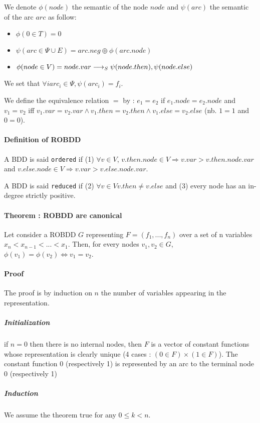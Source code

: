 \documentclass[a4paper,10pt]{article}
\begin{document}

We denote $\phi(node)$ the semantic of the node $node$ and $\psi(arc)$ the semantic of the arc $arc$ as follow:\begin{itemize}
\item $\phi(0 \in T) = 0$
\item $\psi(arc \in \Psi \cup E) = arc.neg \oplus \phi(arc.node)$
\item $\phi(node \in V) = node.var \longrightarrow_S \psi(node.then), \psi(node.else)$
\end{itemize}

We set that $\forall i arc_i \in \Psi, \psi(arc_i) = f_i$.

We define the equivalence relation $=$ by : $e_1 = e_2$ if $e_1.node = e_2.node$ and $v_1 = v_2$ iff $v_1.var = v_2.var \land v_1.then = v_2.then \land v_1.else = v_2.else$ (nb. $1=1$ and $0=0$).

\paragraph{Definition of ROBDD\\}
A BDD is said \texttt{ordered} if (1) $\forall v\in V$, $v.then.node \in V \Rightarrow v.var > v.then.node.var$ and $v.else.node \in V \Rightarrow v.var > v.else.node.var$.

A BDD is said \texttt{reduced} if (2) $\forall v\in V v.then \neq v.else$ and (3) every node has an in-degree strictly positive.

\paragraph{Theorem : ROBDD are canonical\\}

Let consider a ROBDD $G$ representing $F=(f_1, ..., f_n)$ over a set of n variables $x_n < x_{n-1} < ... < x_1$. Then, for every nodes $v_1, v_2 \in G$, $\phi(v_1) = \phi(v_2) \Leftrightarrow v_1 = v_2$.

\paragraph{Proof\\}
The proof is by induction on $n$ the number of variables appearing in the representation.
\subparagraph{Initialization\\}
if $n=0$ then there is no internal nodes, then $F$ is a vector of constant functions whose representation is clearly unique (4 cases : $(0\in F) \times (1\in F)$).
The constant function 0 (respectively 1) is represented by an arc to the terminal node 0 (respectively 1)
\subparagraph{Induction\\}
We assume the theorem true for any $0 \leq k < n$.
\end{document}
